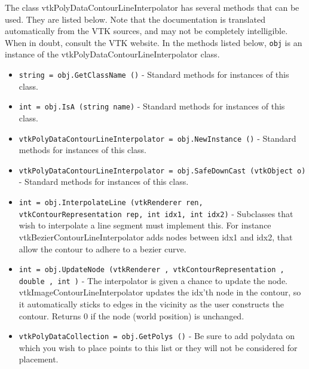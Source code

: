 The class vtkPolyDataContourLineInterpolator has several methods that can be used.
  They are listed below.
Note that the documentation is translated automatically from the VTK sources,
and may not be completely intelligible.  When in doubt, consult the VTK website.
In the methods listed below, \verb|obj| is an instance of the vtkPolyDataContourLineInterpolator class.
\begin{itemize}
\item  \verb|string = obj.GetClassName ()| -  Standard methods for instances of this class.

\item  \verb|int = obj.IsA (string name)| -  Standard methods for instances of this class.

\item  \verb|vtkPolyDataContourLineInterpolator = obj.NewInstance ()| -  Standard methods for instances of this class.

\item  \verb|vtkPolyDataContourLineInterpolator = obj.SafeDownCast (vtkObject o)| -  Standard methods for instances of this class.

\item  \verb|int = obj.InterpolateLine (vtkRenderer ren, vtkContourRepresentation rep, int idx1, int idx2)| -  Subclasses that wish to interpolate a line segment must implement this.
 For instance vtkBezierContourLineInterpolator adds nodes between idx1
 and idx2, that allow the contour to adhere to a bezier curve.

\item  \verb|int = obj.UpdateNode (vtkRenderer , vtkContourRepresentation , double , int )| -  The interpolator is given a chance to update the node.
 vtkImageContourLineInterpolator updates the idx'th node in the contour, 
 so it automatically sticks to edges in the vicinity as the user 
 constructs the contour. 
 Returns 0 if the node (world position) is unchanged.

\item  \verb|vtkPolyDataCollection = obj.GetPolys ()| -  Be sure to add polydata on which you wish to place points to this list
 or they will not be considered for placement.

\end{itemize}
